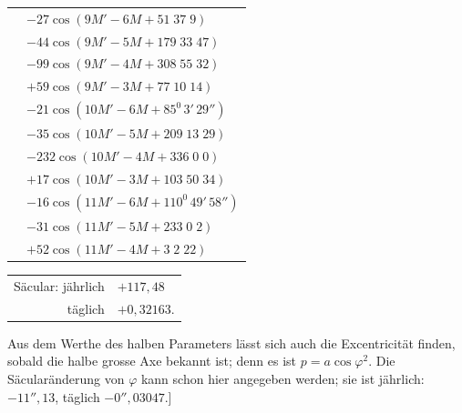 \begin{landscape}
\begin{longtable}{@{}r@{}l@{}}
&\(-27\cos(9M'-6M+51\;37\;9)\)\\
&\(-44\cos(9M'-5M+179\;33\;47)\)\\
&\(-99\cos(9M'-4M+308\;55\;32)\)\\
&\(+59\cos(9M'-3M+77\;10\;14)\)\\[3pt]
&\(-21\cos(10M'-6M+85^0\,3'\,29'')\)\\
&\(-35\cos(10M'-5M+209\;13\;29)\)\\
&\(-232\cos(10M'-4M+336\;0\;0)\)\\
&\(+17\cos(10M'-3M+103\;50\;34)\)\\[3pt]
&\(-16\cos(11M'-6M+110^0\,49'\,58'')\)\\
&\(-31\cos(11M'-5M+233\;0\;2)\)\\
&\(+52\cos(11M'-4M+3\;2\;22)\)
\end{longtable}
\begin{center}
\begin{tabular}{rl}
Säcular: jährlich&\(+117{,}48\)\\
täglich&\(+0{,}32163\).
\end{tabular}
\end{center}
\endgroup
\par\noindent\hspace*{\parindent}Aus dem Werthe des halben Parameters lässt sich auch die Excentricität finden, sobald die halbe grosse Axe bekannt ist; denn es ist \(p=a\cos\varphi^2\). Die Säcularänderung von \(\varphi\) kann schon hier angegeben werden; sie ist jährlich: \(-11''{,}13\), täglich \(-0''{,}03047\).]
\clearpage
\endgroup
\end{landscape}

